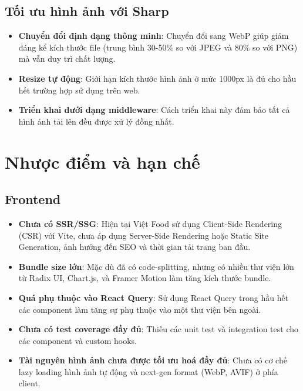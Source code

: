 \subsection{Tối ưu hình ảnh với Sharp}
\begin{itemize}
    \item \textbf{Chuyển đổi định dạng thông minh}: Chuyển đổi sang WebP giúp giảm đáng kể kích thước file (trung bình 30-50\% so với JPEG và 80\% so với PNG) mà vẫn duy trì chất lượng.
    \item \textbf{Resize tự động}: Giới hạn kích thước hình ảnh ở mức 1000px là đủ cho hầu hết trường hợp sử dụng trên web.
    \item \textbf{Triển khai dưới dạng middleware}: Cách triển khai này đảm bảo tất cả hình ảnh tải lên đều được xử lý đồng nhất.
\end{itemize}

\section{Nhược điểm và hạn chế}

\subsection{Frontend}
\begin{itemize}
    \item \textbf{Chưa có SSR/SSG}: Hiện tại Việt Food sử dụng Client-Side Rendering (CSR) với Vite, chưa áp dụng Server-Side Rendering hoặc Static Site Generation, ảnh hưởng đến SEO và thời gian tải trang ban đầu.
    \item \textbf{Bundle size lớn}: Mặc dù đã có code-splitting, nhưng có nhiều thư viện lớn từ Radix UI, Chart.js, và Framer Motion làm tăng kích thước bundle.
    \item \textbf{Quá phụ thuộc vào React Query}: Sử dụng React Query trong hầu hết các component làm tăng sự phụ thuộc vào một thư viện bên ngoài.
    \item \textbf{Chưa có test coverage đầy đủ}: Thiếu các unit test và integration test cho các component và custom hooks.
    \item \textbf{Tài nguyên hình ảnh chưa được tối ưu hoá đầy đủ}: Chưa có cơ chế lazy loading hình ảnh tự động và next-gen format (WebP, AVIF) ở phía client.
\end{itemize}

